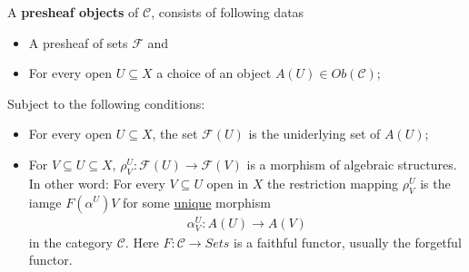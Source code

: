 \documentclass[Total.tex]{subfiles}
\begin{document}
				\begin{Def}
					A \textbf{presheaf objects} of $\mathcal{C}$, consists of following datas
					
					\begin{itemize}
						\item A presheaf of sets $\mathcal{F}$ and 
						\item For every open $U\subseteq X$ a choice of an object $A(U)\in Ob(\mathcal{C})$;
					\end{itemize}
					
					Subject to the following conditions:
					
					\begin{itemize}
						\item For every open $U\subseteq X$, the set $\mathcal{F}(U)$ is the uniderlying set of $A(U)$;
						\item For $V\subseteq U\subseteq X$, $\rho^U_V:\mathcal{F}(U)\rightarrow \mathcal{F}(V)$ is a morphism of algebraic structures. In other word: For every $V\subseteq U$ open in $X$ the restriction mapping $\rho^U_V$ is the iamge $F(\alpha^U)V$ for some \underline{unique} morphism		
						\begin{gather*}
							\alpha_V^U:A(U)\rightarrow A(V)
						\end{gather*}	
						in the category $\mathcal{C}$. Here $F:\mathcal{C}\rightarrow Sets$ is a faithful functor, usually the forgetful functor.
					\end{itemize}
				\end{Def}
				
\end{document}
